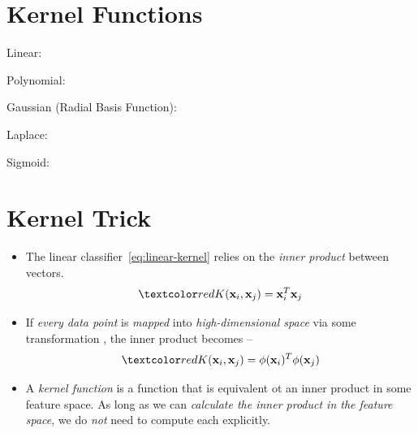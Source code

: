 \documentclass[
	number={2},
	title={Learning Linear Separators{,} SVMs and Kernels}
]{cs584notes}
\begin{document}
\section{Kernel Functions}\label{sec:kernel-functions}
Linear:

Polynomial:

Gaussian (Radial Basis Function):

Laplace:

Sigmoid:

\section{Kernel Trick}\label{sec:kernel-trick}
\begin{itemize}
	\item The linear classifier~\eqref{eq:linear-kernel} relies on the \emph{inner product} between vectors.
	\[ \data{ K(\vec{x}_{i}, \vec{x}_{j}) = \vec{x}_{i}^{T}\vec{x}_{j} } \]
	\item If \emph{every data point} is \emph{mapped} into \emph{high-dimensional space} via some transformation , the inner product becomes --
	\[ \data{ K(\vec{x}_{i}, \vec{x}_{j}) = \phi(\vec{x}_{i})^{T}\phi(\vec{x}_{j}) } \]
	\item A \emph{kernel function} is a function that is equivalent ot an inner product in some feature space.
	As long as we can \emph{calculate the inner product in the feature space}, we do \emph{not} need to compute each  explicitly.
\end{itemize}
\end{document}
